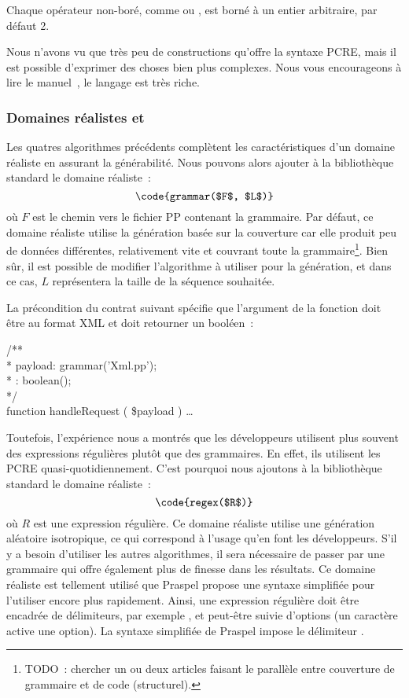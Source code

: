 Chaque opérateur non-boré, comme \code{*} ou \code{+}, est borné à un entier
arbitraire, par défaut 2.

Nous n'avons vu que très peu de constructions qu'offre la syntaxe PCRE, mais il
est possible d'exprimer des choses bien plus complexes. Nous vous encourageons à
lire le manuel~, le langage est très riche.

\subsubsection{Domaines réalistes  et }

Les quatres algorithmes précédents complètent les caractéristiques d'un domaine
réaliste en assurant la générabilité. Nous pouvons alors ajouter à la
bibliothèque standard le domaine réaliste~:
%
$$\code{grammar($F$, $L$)}$$
%
où $F$ est le chemin vers le fichier PP contenant la grammaire. Par défaut, ce
domaine réaliste utilise la génération basée sur la couverture car elle produit
peu de données différentes, relativement vite et couvrant toute la
grammaire\footnote{TODO~: chercher un ou deux articles faisant le parallèle
entre couverture de grammaire et de code (structurel).}. Bien sûr, il est
possible de modifier l'algorithme à utiliser pour la génération, et dans ce cas,
$L$ représentera la taille de la séquence souhaitée.

\begin{example}

La précondition du contrat suivant spécifie que l'argument  de
la fonction  doit être au format XML et doit retourner
un booléen~:

\begin{pre}
/** \\
 * \arequires payload: grammar('Xml.pp'); \\
 * \aensures  \aresult: boolean(); \\
 */ \\
function handleRequest ( \$payload ) { … }
\end{pre}

\end{example}

Toutefois, l'expérience nous a montrés que les développeurs utilisent plus
souvent des expressions régulières plutôt que des grammaires. En effet, ils
utilisent les PCRE quasi-quotidiennement. C'est pourquoi nous ajoutons à la
bibliothèque standard le domaine réaliste~:
%
$$\code{regex($R$)}$$
%
où $R$ est une expression régulière. Ce domaine réaliste utilise une génération
aléatoire isotropique, ce qui correspond à l'usage qu'en font les développeurs.
S'il y a besoin d'utiliser les autres algorithmes, il sera nécessaire de passer
par une grammaire qui offre également plus de finesse dans les résultats. Ce
domaine réaliste est tellement utilisé que Praspel propose une syntaxe
simplifiée pour l'utiliser encore plus rapidement. Ainsi, une expression
régulière doit être encadrée de délimiteurs, par exemple \code{/}, et peut-être
suivie d'options (un caractère active une option). La syntaxe simplifiée de
Praspel impose le délimiteur \code{/}.

